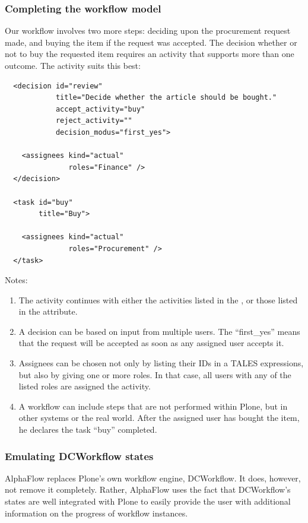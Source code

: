 \subsubsection{Completing the workflow model}

Our workflow involves two more steps: deciding upon the procurement request
made, and buying the item if the request was accepted. The decision whether or not to buy the
requested item requires an activity that supports more than one outcome. 
The  activity suits this best:

\begin{verbatim}
  <decision id="review"
            title="Decide whether the article should be bought."
            accept_activity="buy"
            reject_activity=""
            decision_modus="first_yes">

    <assignees kind="actual"
               roles="Finance" />
  </decision>

  <task id="buy"
        title="Buy">

    <assignees kind="actual"
               roles="Procurement" />
  </task>
\end{verbatim}

Notes:
\begin{enumerate}
\item The  activity continues with either the activities
  listed in the , or those listed in the
   attribute.
\item A decision can be based on input from multiple users. The
   ``first_yes'' means that the request will be
  accepted as soon as any assigned user accepts it.
\item Assignees can be chosen not only by listing their IDs in a TALES
  expressions, but also by giving one or more roles. In that case, all users
  with any of the listed roles are assigned the activity.
\item A workflow can include steps that are not performed within Plone,
  but in other systems or the real world. After the assigned user has bought
  the item, he declares the task ``buy'' completed.
\end{enumerate}

\subsubsection{Emulating DCWorkflow states}

AlphaFlow replaces Plone's own workflow engine, DCWorkflow. It does, however,
not remove it completely. Rather, AlphaFlow uses the fact that DCWorkflow's
states are well integrated with Plone to easily provide the user with
additional information on the progress of workflow instances.

